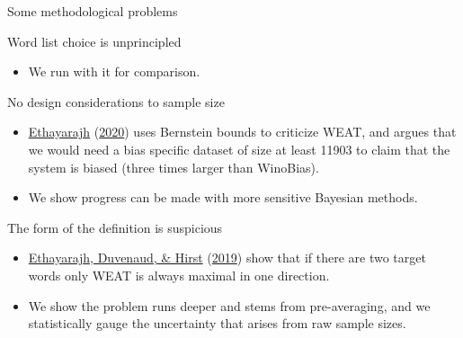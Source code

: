 \documentclass[
  10pt,
  ignorenonframetext,
  x11names, dvipsnames, bibspacing,natbib, table]{beamer}
\providecommand{\tightlist}{%
  \setlength{\itemsep}{0pt}\setlength{\parskip}{0pt}}
\begin{document}
\begin{frame}{Some methodological problems}
\protect\hypertarget{some-methodological-problems}{}
\begin{block}{Word list choice is unprincipled}
\protect\hypertarget{word-list-choice-is-unprincipled}{}
\begin{itemize}
\tightlist
\item
  We run with it for comparison.
\end{itemize}

\pause
\end{block}

\begin{block}{No design considerations to sample size}
\protect\hypertarget{no-design-considerations-to-sample-size}{}
\begin{itemize}
\tightlist
\item
  \protect\hyperlink{ref-Ethayarajh2020measuring}{Ethayarajh}
  (\protect\hyperlink{ref-Ethayarajh2020measuring}{2020}) uses Bernstein
  bounds to criticize WEAT, and argues that we would need a bias
  specific dataset of size at least 11903 to claim that the system is
  biased (three times larger than WinoBias).
\end{itemize}

\pause

\begin{itemize}
\tightlist
\item
  We show progress can be made with more sensitive Bayesian methods.
\end{itemize}
\end{block}

\begin{block}{The form of the definition is suspicious}
\protect\hypertarget{the-form-of-the-definition-is-suspicious}{}
\begin{itemize}
\tightlist
\item
  \protect\hyperlink{ref-Ethayarajh2019understanding}{Ethayarajh,
  Duvenaud, \& Hirst}
  (\protect\hyperlink{ref-Ethayarajh2019understanding}{2019}) show that
  if there are two target words only WEAT is always maximal in one
  direction.
\end{itemize}

\pause

\begin{itemize}
\tightlist
\item
  We show the problem runs deeper and stems from pre-averaging, and we
  statistically gauge the uncertainty that arises from raw sample sizes.
\end{itemize}
\end{block}
\end{frame}
\end{document}
